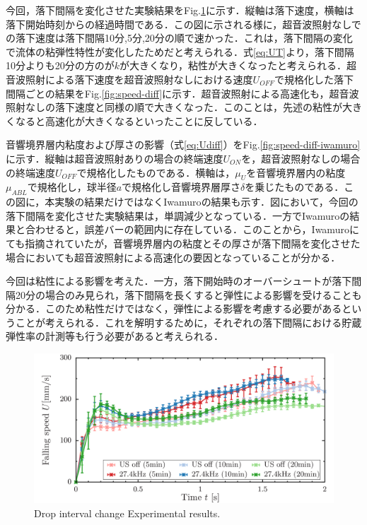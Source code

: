 今回，落下間隔を変化させた実験結果をFig.\ref{fig:interval-change}に示す．縦軸は落下速度，横軸は落下開始時刻からの経過時間である．この図に示される様に，超音波照射なしでの落下速度は落下間隔10分,5分,20分の順で速かった．これは，落下間隔の変化で流体の粘弾性特性が変化したためだと考えられる．式\ref{eq:UT}より，落下間隔10分よりも20分の方のが$k$が大きくなり，粘性が大きくなったと考えられる．超音波照射による落下速度を超音波照射なしにおける速度$U_{OFF}$で規格化した落下間隔ごとの結果をFig.\ref{fig:speed-diff}に示す．超音波照射による高速化も，超音波照射なしの落下速度と同様の順で大きくなった．このことは，先述の粘性が大きくなると高速化が大きくなるといったことに反している．

音響境界層内粘度および厚さの影響（式\ref{eq:Udiff}）をFig.\ref{fig:speed-diff-iwamuro}に示す．縦軸は超音波照射ありの場合の終端速度$U_{ON}$を，超音波照射なしの場合の終端速度$U_{OFF}$で規格化したものである．横軸は，$\mu_U$を音響境界層内の粘度$\mu_{ABL}$で規格化し，球半径$a$で規格化し音響境界層厚さ$\delta$を乗じたものである．この図に，本実験の結果だけではなくIwamuro\cite{ref:8}の結果も示す．図において，今回の落下間隔を変化させた実験結果は，単調減少となっている．一方でIwamuro\cite{ref:8}の結果と合わせると，誤差バーの範囲内に存在している．このことから，Iwamuro\cite{ref:8}にても指摘されていたが，音響境界層内の粘度とその厚さが落下間隔を変化させた場合においても超音波照射による高速化の要因となっていることが分かる．

今回は粘性による影響を考えた．一方，落下開始時のオーバーシュートが落下間隔20分の場合のみ見られ，落下間隔を長くすると弾性による影響を受けることも分かる．このため粘性だけではなく，弾性による影響を考慮する必要があるということが考えられる．これを解明するために，それぞれの落下間隔における貯蔵弾性率の計測等も行う必要があると考えられる．

\begin{figure}[ht]
    \begin{center}
        \includegraphics[width=13cm,clip]{5-Discussion/interval.png} 
        \caption{Drop interval change Experimental results.}
        \label{fig:interval-change}
    \end{center}
\end{figure}


